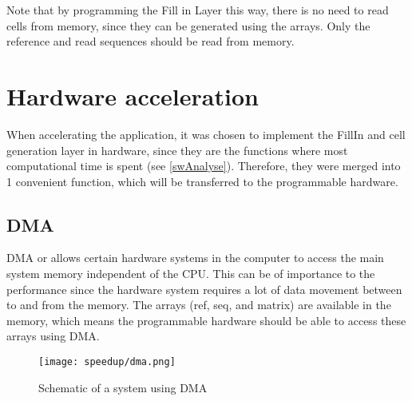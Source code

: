 Note that by programming the Fill in Layer this way, there is no need to read cells from memory, since they can be generated using the arrays. Only the reference and read sequences should be read from memory. 

\section{Hardware acceleration}

When accelerating the application, it was chosen to implement the FillIn and cell generation layer in hardware, since they are the functions where most computational time is spent (see \ref{swAnalyse}). Therefore, they were merged into 1 convenient function, which will be transferred to the programmable hardware. 

\subsection{DMA}

DMA or  allows certain hardware systems in the computer to access the main system memory independent of the CPU. This can be of importance to the performance since the hardware system requires a lot of data movement between to and from the memory. The arrays (ref, seq, and matrix) are available in the memory, which means the programmable hardware should be able to access these arrays using DMA. 

\begin{figure}[H]
	\centering
	\texttt{[image: speedup/dma.png]}
	\caption{Schematic of a system using DMA}
	\label{fig:DMA}
\end{figure}

